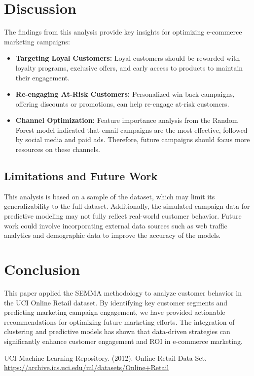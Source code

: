 \documentclass[12pt]{article}
\begin{document}
\section{Discussion}
The findings from this analysis provide key insights for optimizing e-commerce marketing campaigns:
\begin{itemize}
    \item \textbf{Targeting Loyal Customers:} Loyal customers should be rewarded with loyalty programs, exclusive offers, and early access to products to maintain their engagement.
    \item \textbf{Re-engaging At-Risk Customers:} Personalized win-back campaigns, offering discounts or promotions, can help re-engage at-risk customers.
    \item \textbf{Channel Optimization:} Feature importance analysis from the Random Forest model indicated that email campaigns are the most effective, followed by social media and paid ads. Therefore, future campaigns should focus more resources on these channels.
\end{itemize}

\subsection{Limitations and Future Work}
This analysis is based on a sample of the dataset, which may limit its generalizability to the full dataset. Additionally, the simulated campaign data for predictive modeling may not fully reflect real-world customer behavior. Future work could involve incorporating external data sources such as web traffic analytics and demographic data to improve the accuracy of the models.

\section{Conclusion}
This paper applied the SEMMA methodology to analyze customer behavior in the UCI Online Retail dataset. By identifying key customer segments and predicting marketing campaign engagement, we have provided actionable recommendations for optimizing future marketing efforts. The integration of clustering and predictive models has shown that data-driven strategies can significantly enhance customer engagement and ROI in e-commerce marketing.

\begin{thebibliography}{9}
UCI Machine Learning Repository. (2012). Online Retail Data Set. \\
\url{https://archive.ics.uci.edu/ml/datasets/Online+Retail}

\end{thebibliography}
\end{document}
